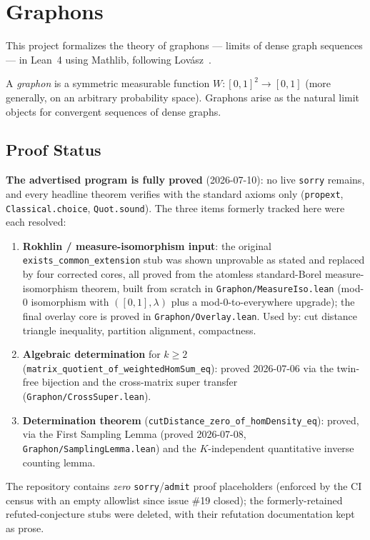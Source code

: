 


\chapter{Graphons}

This project formalizes the theory of graphons --- limits of dense graph sequences ---
in Lean~4 using Mathlib, following Lov\'asz~\cite{lovasz2012}.

A \emph{graphon} is a symmetric measurable function $W : [0,1]^2 \to [0,1]$
(more generally, on an arbitrary probability space).  Graphons arise as the
natural limit objects for convergent sequences of dense graphs.

\section{Proof Status}

\textbf{The advertised program is fully proved} (2026-07-10): no live \texttt{sorry}
remains, and every headline theorem verifies with the standard axioms only
(\texttt{propext}, \texttt{Classical.choice}, \texttt{Quot.sound}). The three items
formerly tracked here were each resolved:
\begin{enumerate}
  \item \textbf{Rokhlin / measure-isomorphism input}: the original
    \texttt{exists\_common\_extension} stub was shown unprovable as stated and replaced
    by four corrected cores, all proved from the atomless standard-Borel
    measure-isomorphism theorem, built from scratch in \texttt{Graphon/MeasureIso.lean}
    (mod-0 isomorphism with $([0,1],\lambda)$ plus a mod-0-to-everywhere upgrade); the
    final overlay core is proved in \texttt{Graphon/Overlay.lean}.
    Used by: cut distance triangle inequality, partition alignment, compactness.
  \item \textbf{Algebraic determination} for $k \ge 2$
    (\texttt{matrix\_quotient\_of\_weightedHomSum\_eq}): proved 2026-07-06 via the
    twin-free bijection and the cross-matrix super transfer
    (\texttt{Graphon/CrossSuper.lean}).
  \item \textbf{Determination theorem}
    (\texttt{cutDistance\_zero\_of\_homDensity\_eq}): proved, via the First Sampling
    Lemma (proved 2026-07-08, \texttt{Graphon/SamplingLemma.lean}) and the
    $K$-independent quantitative inverse counting lemma.
\end{enumerate}
The repository contains \emph{zero} \texttt{sorry}/\texttt{admit} proof placeholders
(enforced by the CI census with an empty allowlist since issue \#19 closed); the
formerly-retained refuted-conjecture stubs were deleted, with their refutation
documentation kept as prose.

